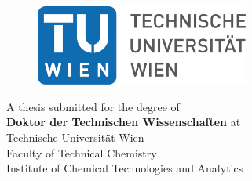 \documentclass[
12pt, %
nolistspacing, %
liststotoc, %
headsepline, %
consistentlayout, %
]{MastersDoctoralThesis} %
\author{Sigmund \textsc{Freud}} %
\begin{document}
\frontmatter %

\pagestyle{plain} %



\begin{titlepage}
\begin{center}


\begin{figure}[th]
\centering
\includegraphics[width=7cm]{TU_LogoDE.pdf}
\vspace{0.4cm}
\label{fig:TUlogo}
\end{figure}



{\huge \bfseries \ttitle\par}\vspace{0.4cm} %

\vfill
A thesis submitted for the degree of\\
\textbf{\large Doktor der Technischen Wissenschaften}
\vfill
at\\
\large Technische Universität Wien\\
\normalsize
Faculty of Technical Chemistry\\
Institute of Chemical Technologies and Analytics\\


\end{center}
\end{titlepage}
\end{document}
